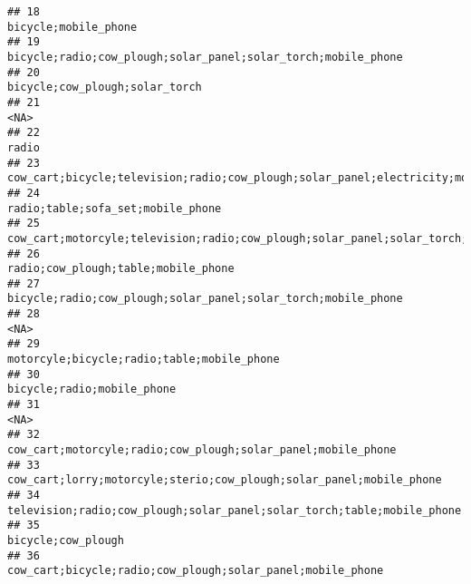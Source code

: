 \documentclass[
]{article}
\begin{document}
\begin{verbatim}
## 18                                                                                                                      bicycle;mobile_phone
## 19                                                                             bicycle;radio;cow_plough;solar_panel;solar_torch;mobile_phone
## 20                                                                                                            bicycle;cow_plough;solar_torch
## 21                                                                                                                                      <NA>
## 22                                                                                                                                     radio
## 23                                                         cow_cart;bicycle;television;radio;cow_plough;solar_panel;electricity;mobile_phone
## 24                                                                                                         radio;table;sofa_set;mobile_phone
## 25                                        cow_cart;motorcyle;television;radio;cow_plough;solar_panel;solar_torch;table;sofa_set;mobile_phone
## 26                                                                                                       radio;cow_plough;table;mobile_phone
## 27                                                                             bicycle;radio;cow_plough;solar_panel;solar_torch;mobile_phone
## 28                                                                                                                                      <NA>
## 29                                                                                                motorcyle;bicycle;radio;table;mobile_phone
## 30                                                                                                                bicycle;radio;mobile_phone
## 31                                                                                                                                      <NA>
## 32                                                                              cow_cart;motorcyle;radio;cow_plough;solar_panel;mobile_phone
## 33                                                                       cow_cart;lorry;motorcyle;sterio;cow_plough;solar_panel;mobile_phone
## 34                                                                    television;radio;cow_plough;solar_panel;solar_torch;table;mobile_phone
## 35                                                                                                                        bicycle;cow_plough
## 36                                                                                cow_cart;bicycle;radio;cow_plough;solar_panel;mobile_phone

\end{verbatim}
\end{document}
